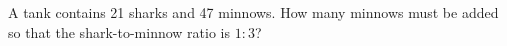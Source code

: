 A tank contains 21 sharks and 47 minnows. How many minnows must be added so that the shark-to-minnow ratio is $ 1:3 $?

